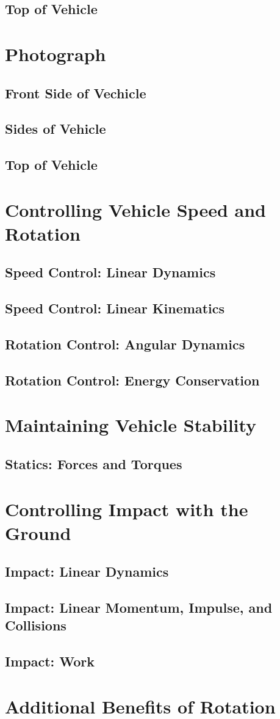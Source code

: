 \documentclass[12pt]{report}
\begin{document}
\section{Top of Vehicle}


\chapter{Photograph}
\section{Front Side of Vechicle}
\section{Sides of Vehicle}
\section{Top of Vehicle}



\chapter{Controlling Vehicle Speed and Rotation}
\section{Speed Control: Linear Dynamics}
\section{Speed Control: Linear Kinematics}
\section{Rotation Control: Angular Dynamics}
\section{Rotation Control: Energy Conservation}


\chapter{Maintaining Vehicle Stability}
\section{Statics: Forces and Torques}


\chapter{Controlling Impact with the Ground}
\section{Impact: Linear Dynamics}
\section{Impact: Linear Momentum, Impulse, and Collisions}
\section{Impact: Work}


\chapter{Additional Benefits of Rotation}
\end{document}
